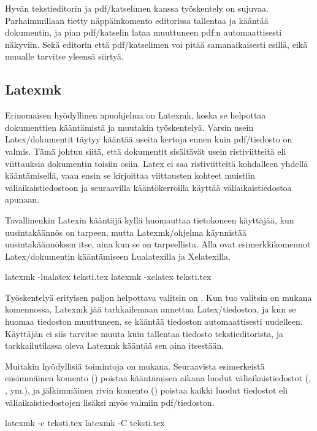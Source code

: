 Hyvän tekstieditorin ja pdf\-/katselimen kanssa työskentely on sujuvaa.
Parhaimmillaan tietty näppäinkomento editorissa tallentaa ja kääntää
dokumentin, ja pian pdf\-/katselin lataa muuttuneen pdf:n
automaattisesti näkyviin. Sekä editorin että pdf\-/katselimen voi pitää
sa\-man\-aikai\-ses\-ti esillä, eikä muualle tarvitse yleensä siirtyä.

\subsection{Latexmk}
\label{luku:latexmk}

Erin\-omaisen hyödyllinen apu\-ohjelma on Latexmk, koska se helpottaa
dokumenttien kääntämistä ja muutakin työskentelyä. Varsin usein
Latex\-/dokumentit täytyy kääntää useita kertoja ennen kuin
pdf\-/tiedosto on valmis. Tämä johtuu siitä, että dokumentit sisältävät
usein ristiviitteitä eli viittauksia dokumentin toisiin osiin. Latex ei
saa ristiviitteitä kohdalleen yhdellä kääntämisellä, vaan ensin se
kirjoittaa viittausten kohteet muistiin väliaikaistiedostoon ja
seuraavilla kääntökerroilla käyttää väliaikaistiedostoa apunaan.

Tavallinenkin Latexin kääntäjä kyllä huomauttaa tietokoneen käyttäjää,
kun uusintakäännös on tarpeen, mutta Latexmk\-/ohjelma käynnistää
uusintakäännöksen itse, aina kun se on tarpeellista. Alla ovat
esimerkkikomennot Latex\-/dokumentin kääntämiseen Lualatexilla ja
Xelatexilla.

\begin{koodilohkosis}
  latexmk -lualatex teksti.tex
  latexmk -xelatex  teksti.tex
\end{koodilohkosis}

Työskentelyä erityisen paljon helpottava valitsin on . Kun
tuo valitsin on mukana komennossa, Latexmk jää tarkkailemaan annettua
Latex\-/tiedostoa, ja kun se huomaa tiedoston muuttuneen, se kääntää
tiedoston automaattisesti uudelleen. Käyttäjän ei siis tarvitse muuta
kuin tallentaa tiedosto tekstieditorista, ja tarkkailutilassa oleva
Latexmk kääntää sen aina itsestään.

Muitakin hyödyllisiä toimintoja on mukana. Seuraavista esimerkeistä
ensimmäinen komento () poistaa kääntämisen aikana
luodut väliaikaistiedostot (, ,  ym.),
ja jälkimmäinen rivin komento () poistaa kaikki
luodut tiedostot eli väliaikaistiedostojen lisäksi myös valmiin
pdf\-/tiedoston.

\begin{koodilohkosis}
  latexmk -c teksti.tex
  latexmk -C teksti.tex
\end{koodilohkosis}

